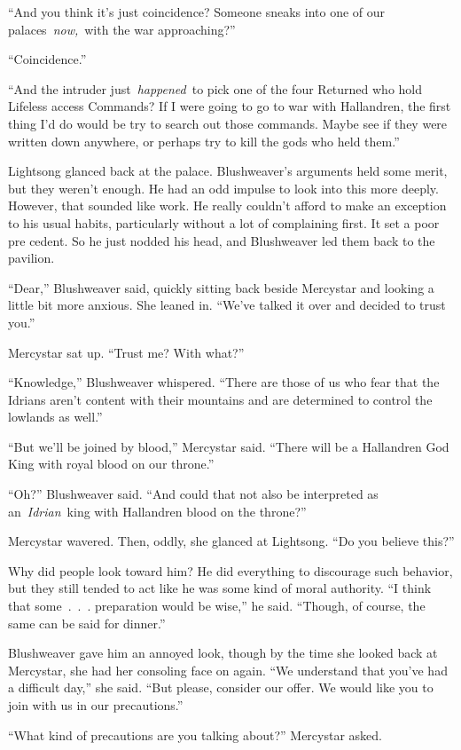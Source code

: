 “And you think it’s just coincidence? Someone sneaks into one of our palaces~\textit{now,}~with the war approaching?”

“Coincidence.”

“And the intruder just~\textit{happened}~to pick one of the four Returned who hold Lifeless access Commands? If I were going to go to war with Hallandren, the first thing I’d do would be try to search out those commands. Maybe see if they were written down anywhere, or perhaps try to kill the gods who held them.”

Lightsong glanced back at the palace. Blushweaver’s arguments held some merit, but they weren’t enough. He had an odd impulse to look into this more deeply. However, that sounded like work. He really couldn’t afford to make an exception to his usual habits, particularly without a lot of complaining first. It set a poor pre cedent. So he just nodded his head, and Blushweaver led them back to the pavilion.

“Dear,” Blushweaver said, quickly sitting back beside Mercystar and looking a little bit more anxious. She leaned in. “We’ve talked it over and decided to trust you.”

Mercystar sat up. “Trust me? With what?”

“Knowledge,” Blushweaver whispered. “There are those of us who fear that the Idrians aren’t content with their mountains and are determined to control the lowlands as well.”

“But we’ll be joined by blood,” Mercystar said. “There will be a Hallandren God King with royal blood on our throne.”

“Oh?” Blushweaver said. “And could that not also be interpreted as an~\textit{Idrian}~king with Hallandren blood on the throne?”

Mercystar wavered. Then, oddly, she glanced at Lightsong. “Do you believe this?”

Why did people look toward him? He did everything to discourage such behavior, but they still tended to act like he was some kind of moral authority. “I think that some~.~.~. preparation would be wise,” he said. “Though, of course, the same can be said for dinner.”

Blushweaver gave him an annoyed look, though by the time she looked back at Mercystar, she had her consoling face on again. “We understand that you’ve had a difficult day,” she said. “But please, consider our offer. We would like you to join with us in our precautions.”

“What kind of precautions are you talking about?” Mercystar asked.

